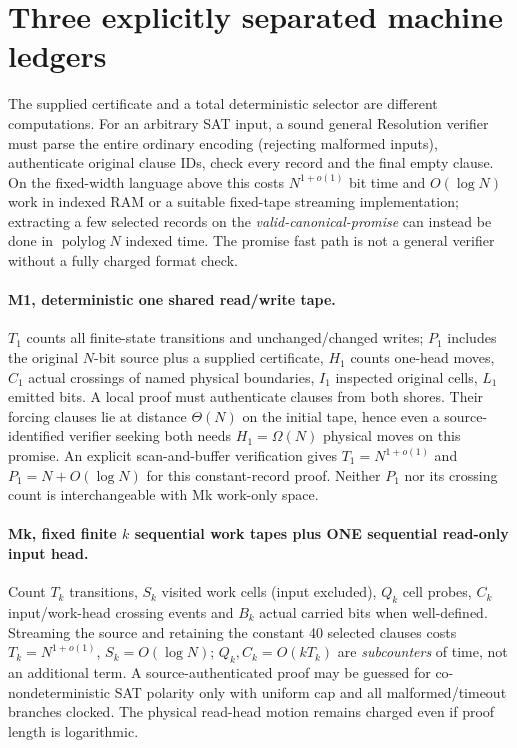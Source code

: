 \documentclass[11pt]{article}
\begin{document}
\section{Three explicitly separated machine ledgers}
The supplied certificate and a total deterministic selector are different computations. For an arbitrary SAT input, a sound general Resolution verifier must parse the entire ordinary encoding (rejecting malformed inputs), authenticate original clause IDs, check every record and the final empty clause. On the fixed-width language above this costs $N^{1+o(1)}$ bit time and $O(\log N)$ work in indexed RAM or a suitable fixed-tape streaming implementation; extracting a few selected records on the \emph{valid-canonical-promise} can instead be done in $\operatorname{polylog}N$ indexed time. The promise fast path is not a general verifier without a fully charged format check.

\paragraph{M1, deterministic one shared read/write tape.} $T_1$ counts all finite-state transitions and unchanged/changed writes; $P_1$ includes the original $N$-bit source plus a supplied certificate, $H_1$ counts one-head moves, $C_1$ actual crossings of named physical boundaries, $I_1$ inspected original cells, $L_1$ emitted bits. A local proof must authenticate clauses from both shores. Their forcing clauses lie at distance $\Theta(N)$ on the initial tape, hence even a source-identified verifier seeking both needs $H_1=\Omega(N)$ physical moves on this promise. An explicit scan-and-buffer verification gives $T_1=N^{1+o(1)}$ and $P_1=N+O(\log N)$ for this constant-record proof. Neither $P_1$ nor its crossing count is interchangeable with Mk work-only space.

\paragraph{Mk, fixed finite $k$ sequential work tapes plus ONE sequential read-only input head.} Count $T_k$ transitions, $S_k$ visited work cells (input excluded), $Q_k$ cell probes, $C_k$ input/work-head crossing events and $B_k$ actual carried bits when well-defined. Streaming the source and retaining the constant 40 selected clauses costs $T_k=N^{1+o(1)}$, $S_k=O(\log N)$; $Q_k,C_k=O(kT_k)$ are \emph{subcounters} of time, not an additional term. A source-authenticated proof may be guessed for co-nondeterministic SAT polarity only with uniform cap and all malformed/timeout branches clocked. The physical read-head motion remains charged even if proof length is logarithmic.
\end{document}
